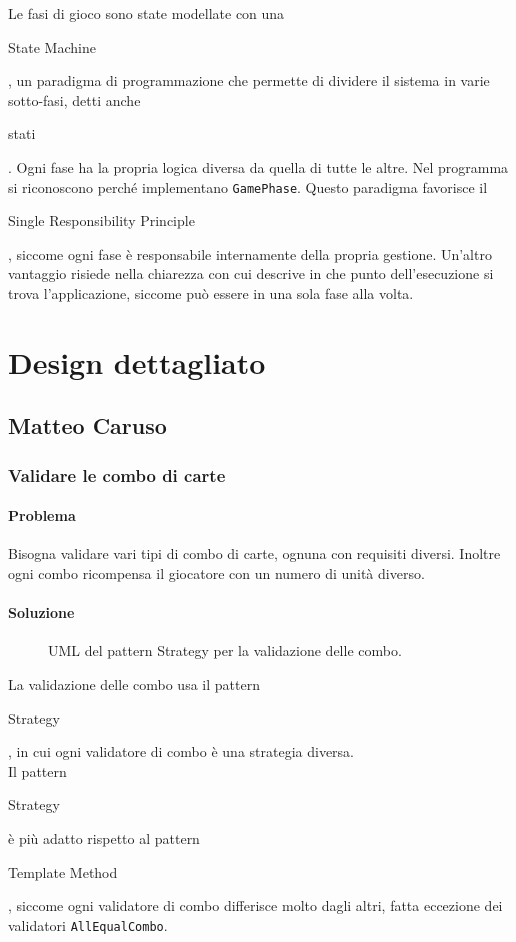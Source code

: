 \documentclass[a4paper,12pt]{report}
\begin{document}
Le fasi di gioco sono state modellate con una \begin{itshape}State Machine\end{itshape}, un paradigma di programmazione che permette di dividere il sistema in varie sotto-fasi, detti anche \begin{itshape}stati\end{itshape}. Ogni fase ha la propria logica diversa da quella di tutte le altre. Nel programma si riconoscono perché implementano \texttt{GamePhase}.
Questo paradigma favorisce il \begin{itshape}Single Responsibility Principle\end{itshape}, siccome ogni fase è responsabile internamente della propria gestione.
Un'altro vantaggio risiede nella chiarezza con cui descrive in che punto dell'esecuzione si trova l'applicazione, siccome può essere in una sola fase alla volta.

\section{Design dettagliato}
\subsection{Matteo Caruso}
\subsubsection{Validare le combo di carte}
\paragraph{Problema}
Bisogna validare vari tipi di combo di carte, ognuna con requisiti diversi. Inoltre ogni combo ricompensa il giocatore con un numero di unità diverso.
\paragraph{Soluzione}
\begin{figure}[H]
	\centering
	
	\caption{UML del pattern Strategy per la validazione delle combo.}
\end{figure}
La validazione delle combo usa il pattern \begin{itshape}Strategy\end{itshape}, in cui ogni validatore di combo è una strategia diversa.
\\
Il pattern \begin{itshape}Strategy\end{itshape} è più adatto rispetto al pattern \begin{itshape}Template Method\end{itshape}, siccome ogni validatore di combo differisce molto dagli altri, fatta eccezione dei validatori \texttt{AllEqualCombo}.
\end{document}
